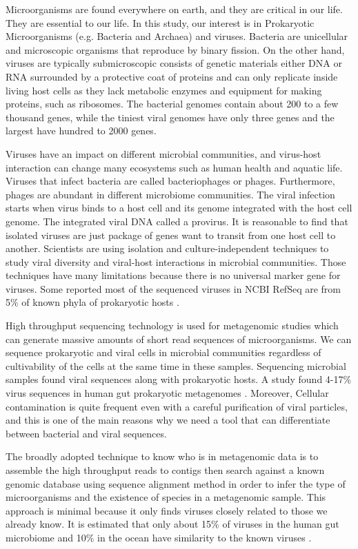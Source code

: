 \documentclass[conference]{IEEEtran}
\begin{document}
Microorganisms are found everywhere on earth, and they are critical in our life. They are essential to our life. In this study, our interest is in Prokaryotic Microorganisms (e.g. Bacteria and Archaea) and viruses. Bacteria are unicellular and microscopic organisms that reproduce by binary fission. On the other hand, viruses are typically submicroscopic consists of genetic materials either DNA or RNA surrounded by a protective coat of proteins and can only replicate inside living host cells as they lack metabolic enzymes and equipment for making proteins, such as ribosomes. The bacterial genomes contain about 200 to a few thousand genes, while the tiniest viral genomes have only three genes and the largest have hundred to 2000 genes. 

Viruses have an impact on different microbial communities, and virus-host interaction can change many ecosystems such as human health and aquatic life. Viruses that infect bacteria are called bacteriophages or phages. Furthermore, phages are abundant in different microbiome communities. The viral infection starts when virus binds to a host cell and its genome integrated with the host cell genome. The integrated viral DNA called a provirus. It is reasonable to find that isolated viruses are just package of genes want to transit from one host cell to another. Scientists are using isolation and culture-independent techniques to study viral diversity and viral-host interactions in microbial communities. Those techniques have many limitations because there is no universal marker gene for viruses. Some reported most of the sequenced viruses in NCBI RefSeq are from 5\% of known phyla of prokaryotic hosts \cite{roux2015viral}.

High throughput sequencing technology is used for metagenomic studies which can generate massive amounts of short read sequences of microorganisms. We can sequence prokaryotic and viral cells in microbial communities regardless of cultivability of the cells at the same time in these samples. Sequencing microbial samples found viral sequences along with prokaryotic hosts. A study found 4-17\% virus sequences in human gut prokaryotic metagenomes \cite{minot2011human}. Moreover, Cellular contamination is quite frequent even with a careful purification of viral particles, and this is one of the main reasons why we need a tool that can differentiate between bacterial and viral sequences.

The broadly adopted technique to know who is in metagenomic data is to assemble the high throughput reads to contigs then search against a known genomic database using sequence alignment method in order to infer the type of microorganisms and the existence of species in a metagenomic sample. This approach is minimal because it only finds viruses closely related to those we already know. It is estimated that only about 15\% of viruses in the human gut microbiome and 10\% in the ocean have similarity to the known viruses \cite{ren2017virfinder}. 
\end{document}
